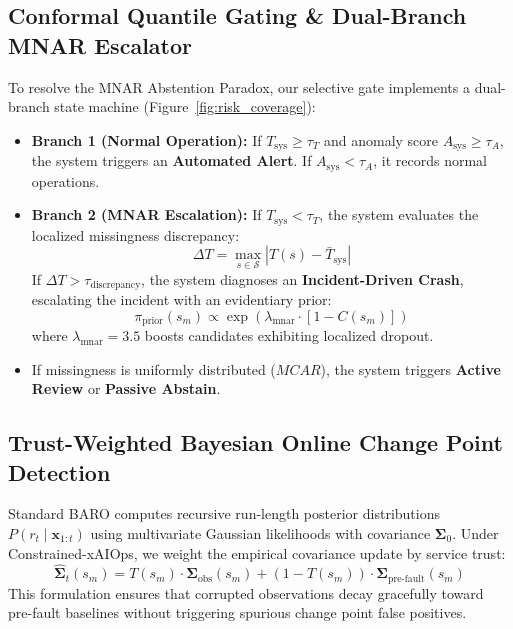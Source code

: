 \documentclass[conference]{IEEEtran}
\begin{document}
\subsection{Conformal Quantile Gating \& Dual-Branch MNAR Escalator}
To resolve the MNAR Abstention Paradox, our selective gate implements a dual-branch state machine (Figure~\ref{fig:risk_coverage}):
\begin{itemize}
    \item \textbf{Branch 1 (Normal Operation):} If $T_{\text{sys}} \ge \tau_T$ and anomaly score $A_{\text{sys}} \ge \tau_A$, the system triggers an \textbf{Automated Alert}. If $A_{\text{sys}} < \tau_A$, it records normal operations.
    \item \textbf{Branch 2 (MNAR Escalation):} If $T_{\text{sys}} < \tau_T$, the system evaluates the localized missingness discrepancy:
    \begin{equation}
    \Delta T = \max_{s \in \mathcal{S}} |T(s) - \bar{T}_{\text{sys}}|
    \end{equation}
    If $\Delta T > \tau_{\text{discrepancy}}$, the system diagnoses an \textbf{Incident-Driven Crash}, escalating the incident with an evidentiary prior:
    \begin{equation}
    \pi_{\text{prior}}(s_m) \propto \exp\left( \lambda_{\text{mnar}} \cdot \left[1 - C(s_m)\right] \right)
    \end{equation}
    where $\lambda_{\text{mnar}} = 3.5$ boosts candidates exhibiting localized dropout.
    \item If missingness is uniformly distributed ($MCAR$), the system triggers \textbf{Active Review} or \textbf{Passive Abstain}.
\end{itemize}

\subsection{Trust-Weighted Bayesian Online Change Point Detection}
Standard BARO computes recursive run-length posterior distributions $P(r_t \mid \mathbf{x}_{1:t})$ using multivariate Gaussian likelihoods with covariance $\boldsymbol{\Sigma}_0$. Under Constrained-xAIOps, we weight the empirical covariance update by service trust:
\begin{equation}
\hat{\boldsymbol{\Sigma}}_t(s_m) = T(s_m) \cdot \boldsymbol{\Sigma}_{\text{obs}}(s_m) + (1 - T(s_m)) \cdot \boldsymbol{\Sigma}_{\text{pre-fault}}(s_m)
\end{equation}
This formulation ensures that corrupted observations decay gracefully toward pre-fault baselines without triggering spurious change point false positives.
\end{document}
